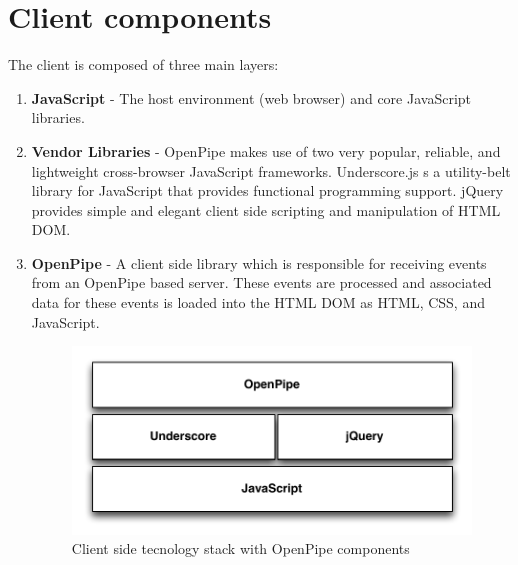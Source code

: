 \documentclass[12pt]{report}
\begin{document}
\section{Client components}

The client is composed of three main layers:

\begin{enumerate}
	\item \textbf{JavaScript} - The host environment (web browser) and core JavaScript libraries.
	\item \textbf{Vendor Libraries} - OpenPipe makes use of two very popular, reliable, and lightweight cross-browser JavaScript frameworks. Underscore.js s a utility-belt library for JavaScript that provides functional programming support. jQuery provides simple and elegant client side scripting and manipulation of HTML DOM.
	
	\item \textbf{OpenPipe} - A client side library which is responsible for receiving events from an OpenPipe based server. These events are processed and associated data for these events is loaded into the HTML DOM as HTML, CSS, and JavaScript.
		\begin{figure}[H]
		\caption{Client side tecnology stack with OpenPipe components}
		\label{fig:clientFrameworkStack}
		\centering
		\includegraphics[width=\textwidth,keepaspectratio]{figures/images/client_stack.pdf}
		\end{figure}
\end{enumerate}




\end{document}

